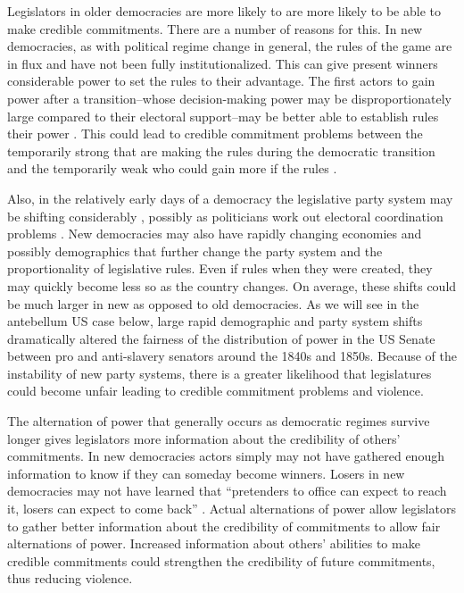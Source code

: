 \documentclass[a4paper]{article}\usepackage[]{graphicx}\usepackage[]{color}
\begin{document}
Legislators in older democracies are more likely to  are more likely to be able to make  credible commitments. There are a number of reasons for this. In new democracies, as with political regime change in general, the rules of the game are in flux and have not been fully institutionalized. This can give present winners considerable power to set the rules to their advantage. The first actors to gain power after a transition--whose decision-making power may be disproportionately large compared to their electoral support--may be better able to establish  rules their power  \cite[108]{Saideman2002}. This could lead to credible commitment problems between the temporarily strong that are making the rules during the democratic transition and the temporarily weak who could gain more if the rules .

Also, in the relatively early days of a democracy the legislative party system may be shifting considerably \cite[161 for a review]{Mainwaring2007b}, possibly as politicians work out electoral coordination problems \citep{cox1997}. New democracies may also have rapidly changing economies and possibly demographics that further change the party system and the proportionality of legislative rules. Even if rules  when they were created, they may quickly become less so as the country changes. On average, these shifts could be much larger in new as opposed to old democracies. As we will see in the antebellum US case below, large rapid demographic and party system shifts dramatically altered the fairness of the distribution of power in the US Senate between pro and anti-slavery senators around the 1840s and 1850s. Because of the instability of new party systems, there is a greater likelihood that legislatures could become unfair leading to credible commitment problems and violence.

The alternation of power that generally occurs as democratic regimes survive longer gives legislators more information about the credibility of others' commitments. In new democracies actors simply may not have gathered enough information to know if they can someday become winners. Losers in new democracies may not have learned that ``pretenders to office can expect to reach it, losers can expect to come back'' \citep[][36]{Przeworski1991}. Actual alternations of power allow legislators to gather better information about the credibility of commitments to allow fair alternations of power. Increased information about others' abilities to make credible commitments could strengthen the credibility of future commitments, thus reducing violence.
\end{document}
